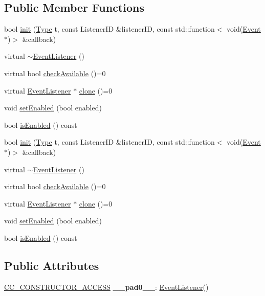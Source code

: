 \subsection*{Public Member Functions}
\begin{DoxyCompactItemize}
\item 
bool \hyperlink{classEventListener_a4acf01a750bd53ff94f7d7fb38a8b88d}{init} (\hyperlink{classEventListener_ab78e6acdfa2343490eda9e92d1555ee4}{Type} t, const Listener\+ID \&listener\+ID, const std\+::function$<$ void(\hyperlink{classEvent}{Event} $\ast$)$>$ \&callback)
\item 
virtual \hyperlink{classEventListener_a7cc493c3e3df36d14e33504d8a92c898}{$\sim$\+Event\+Listener} ()
\item 
virtual bool \hyperlink{classEventListener_adf9e4eb37ea6e94c05f4d1b6594bd35e}{check\+Available} ()=0
\item 
virtual \hyperlink{classEventListener}{Event\+Listener} $\ast$ \hyperlink{classEventListener_a8707b41e85031f08e48def3584d51bc0}{clone} ()=0
\item 
void \hyperlink{classEventListener_a962aaf9f2de557fbb38e457569bca352}{set\+Enabled} (bool enabled)
\item 
bool \hyperlink{classEventListener_a6cf479cbd2b14dcba8f270fb11b38fe5}{is\+Enabled} () const
\item 
bool \hyperlink{classEventListener_a4acf01a750bd53ff94f7d7fb38a8b88d}{init} (\hyperlink{classEventListener_ab78e6acdfa2343490eda9e92d1555ee4}{Type} t, const Listener\+ID \&listener\+ID, const std\+::function$<$ void(\hyperlink{classEvent}{Event} $\ast$)$>$ \&callback)
\item 
virtual \hyperlink{classEventListener_ad03c1e6f45e92434d502995a4f31685e}{$\sim$\+Event\+Listener} ()
\item 
virtual bool \hyperlink{classEventListener_abef02641f86a853c36e063180c18f052}{check\+Available} ()=0
\item 
virtual \hyperlink{classEventListener}{Event\+Listener} $\ast$ \hyperlink{classEventListener_a8707b41e85031f08e48def3584d51bc0}{clone} ()=0
\item 
void \hyperlink{classEventListener_a962aaf9f2de557fbb38e457569bca352}{set\+Enabled} (bool enabled)
\item 
bool \hyperlink{classEventListener_a6cf479cbd2b14dcba8f270fb11b38fe5}{is\+Enabled} () const
\end{DoxyCompactItemize}
\subsection*{Public Attributes}
\begin{DoxyCompactItemize}
\item 
\mbox{\label{classEventListener_a451622d5f01c57cf9f43b632dc2b7098}} 
\hyperlink{_2cocos2d_2cocos_2base_2ccConfig_8h_a25ef1314f97c35a2ed3d029b0ead6da0}{C\+C\+\_\+\+C\+O\+N\+S\+T\+R\+U\+C\+T\+O\+R\+\_\+\+A\+C\+C\+E\+SS} {\bfseries \+\_\+\+\_\+pad0\+\_\+\+\_\+}\+: \hyperlink{classEventListener}{Event\+Listener}()
\end{DoxyCompactItemize}
